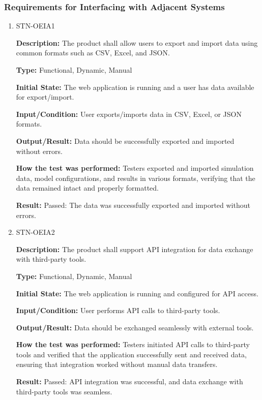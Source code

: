 \documentclass[12pt, titlepage]{article}
\begin{document}
\subsubsection{Requirements for Interfacing with Adjacent Systems}

\begin{enumerate}

\item{STN-OEIA1}

\textbf{Description:} The product shall allow users to export and import data using common formats such as CSV, Excel, and JSON.

\textbf{Type:} Functional, Dynamic, Manual

\textbf{Initial State:} The web application is running and a user has data available for export/import.

\textbf{Input/Condition:} User exports/imports data in CSV, Excel, or JSON formats.

\textbf{Output/Result:} Data should be successfully exported and imported without errors.

\textbf{How the test was performed:} Testers exported and imported simulation data, model configurations, and results in various formats, verifying that the data remained intact and properly formatted.

\textbf{Result:} Passed: The data was successfully exported and imported without errors.

\item{STN-OEIA2}

\textbf{Description:} The product shall support API integration for data exchange with third-party tools.

\textbf{Type:} Functional, Dynamic, Manual

\textbf{Initial State:} The web application is running and configured for API access.

\textbf{Input/Condition:} User performs API calls to third-party tools.

\textbf{Output/Result:} Data should be exchanged seamlessly with external tools.

\textbf{How the test was performed:} Testers initiated API calls to third-party tools and verified that the application successfully sent and received data, ensuring that integration worked without manual data transfers.

\textbf{Result:} Passed: API integration was successful, and data exchange with third-party tools was seamless.

\end{enumerate}
\end{document}
